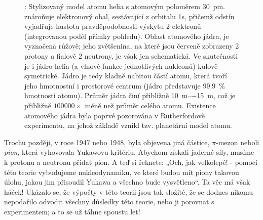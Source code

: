     \begin{figure}[hbt!]  %
      \centering
      \caption{ \wikiAtomJadro: Stylizovaný model atomu helia s atomovým poloměrem \SI{30}{\pm}.
                 znároňuje  elektronový obal, sestávající z orbitalu 1s, přičemž odstín
                vyjadřuje hustotu pravděpodobnosti výskytu 2 elektronů (integrovanou podél přímky
                pohledu). Oblast atomového jádra, je vyznačena růžově; jeho zvětšenina, na které
                jsou červeně zobrazeny 2 protony a fialově 2 neutrony, je však jen schematická. Ve
                skutečnosti je i jádro helia (a vlnové funkce jednotlivých nukleonů) kulově
                symetrické. Jádro je tedy kladně nabitou částí atomu, která tvoří jeho hmotnostní i
                prostorové centrum (jádro představuje \SI{99.9}{\percent} hmotnosti atomu). Průměr
                jádra činí přibližně \SIrange{10}{-15}{\m}, což je přibližně \(\num{100 000}\times\)
                méně než průměr celého atomu. Existence atomového jádra byla poprvé pozorována v
                Rutherfordově experimentu, na jehož základě vznikl tzv. planetární model atomu.}
      \label{fyz:fig895}
    \end{figure} 
    
    Trochu později, v roce 1947 nebo 1948, byla objevena jiná částice, \(\pi\text{-mezon}\) neboli 
    \emph{pion}, která vyhovovala Yukawovu kritériu. Abychom získali jaderné síly, musíme k protonu 
    a neutronu přidat pion. A teď si řeknete: „Och, jak velkolepé! - pomocí této teorie vybudujeme 
    nukleodynamiku, ve které budou mít piony takovou úlohu, jakou jim přisoudil Yukawa a všechno 
    bude vysvětleno“. Ta věc má však háček! Ukázalo se, že výpočty v této teorii jsou tak složité, 
    že se dodnes nikomu nepodařilo odvodit všechny důsledky této teorie, nebo ji porovnat s 
    experimentem; a to se už táhne spoustu let!
    
